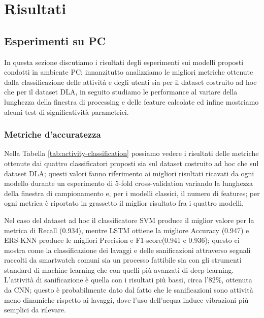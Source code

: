 \chapter{Risultati}
\label{cap:risultati}

\section{Esperimenti su PC}
\label{sec:esperimenti-su-pc}

In questa sezione discutiamo i risultati degli esperimenti sui modelli proposti condotti in ambiente PC; innanzitutto analizziamo le migliori metriche ottenute dalla classificazione delle attività e degli utenti sia per il dataset costruito ad hoc che per il dataset DLA, in seguito studiamo le performance al variare della lunghezza della finestra di processing e delle feature calcolate ed infine mostriamo alcuni test di significatività parametrici.

\subsection{Metriche d'accuratezza}
\label{ssec:metriche-di-accuratezza}

Nella Tabella \ref{tab:activity-classification} possiamo vedere i risultati delle metriche ottenute dai quattro classificatori proposti sia sul dataset costruito ad hoc che sul dataset DLA; questi valori fanno riferimento ai migliori risultati ricavati da ogni modello durante un esperimento di 5-fold cross-validation variando la lunghezza della finestra di campionamento e, per i modelli classici, il numero di features; per ogni metrica è riportato in grassetto il miglior risultato fra i quattro modelli.

Nel caso del dataset ad hoc il classificatore SVM produce il miglior valore per la metrica di Recall (0.934), mentre LSTM ottiene la migliore Accuracy (0.947) e ERS-KNN produce le migliori Precision e F1-score(0.941 e 0.936); questo ci mostra come la classificazione dei lavaggi e delle sanificazioni attraverso segnali raccolti da smartwatch comuni sia un processo fattibile sia con gli strumenti standard di machine learning che con quelli più avanzati di deep learning. L'attività di sanificazione è quella con i risultati più bassi, circa l'82\%, ottenuta da CNN; questo è probabilmente dato dal fatto che le sanificazioni sono attività meno dinamiche rispetto ai lavaggi, dove l'uso dell'acqua induce vibrazioni più semplici da rilevare.

